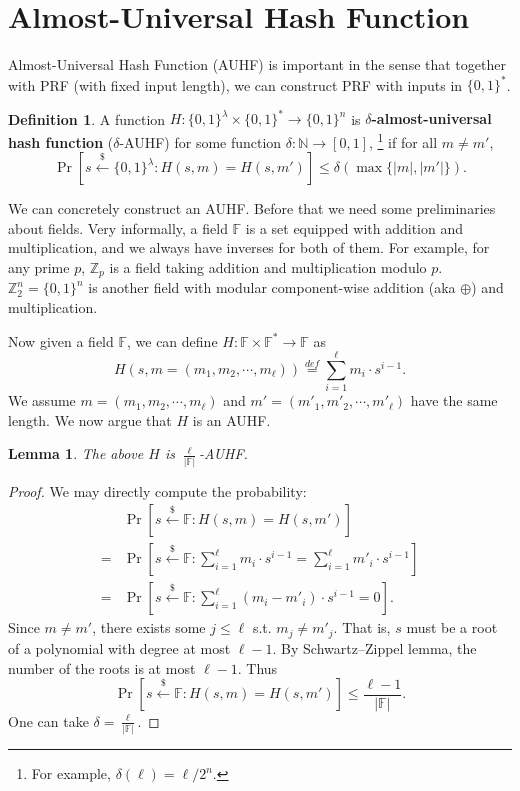 \documentclass[12pt]{article}
\newcommand{\eqdef}{\stackrel{def}{=}}
\newcommand{\N}{\mathbb{N}}
\newcommand{\Z}{\mathbb{Z}}
\newcommand{\F}{\mathbb{F}}
\newcommand{\bits}{\{0,1\}}
\newcommand{\getsr}{\stackrel{\$}{\gets}}
\newtheorem{lemma}[theorem]{Lemma}
\theoremstyle{definition}
\newtheorem{definition}[theorem]{Definition}
\begin{document}
\section{Almost-Universal Hash Function}
Almost-Universal Hash Function (AUHF) is important in the sense that together with PRF (with fixed input length), we can construct PRF with inputs in $\bits^*$.

\begin{definition}
A function $H : \bits^\lambda \times \bits^* \to \bits^n$ is {\bf $\delta$-almost-universal hash function} ($\delta$-AUHF) for some function $\delta : \N \to [0,1]$, \footnote{For example, $\delta(\ell) = \ell/2^n$.} if for all $m \not= m'$,
$$\Pr[s \getsr \bits^\lambda : H(s,m) = H(s, m')] \leq \delta(\max\{|m|, |m'|\}).$$ 
\end{definition}

We can concretely construct an AUHF. Before that we need some preliminaries about fields. Very informally, a field $\F$ is a set equipped with addition and multiplication, and we always have inverses for both of them. For example, for any prime $p$, $\Z_p$ is a field taking addition and multiplication modulo $p$. $\Z_2^n = \bits^n$ is another field with modular component-wise addition (aka $\oplus$) and multiplication. 

Now given a field $\F$, we can define $H : \F \times \F^* \to \F$ as
$$H(s, m=(m_1, m_2, \cdots, m_\ell)) \eqdef \sum_{i=1}^{\ell} m_i \cdot s^{i-1}.$$
We assume $m = (m_1, m_2, \cdots, m_\ell)$ and $m' = (m'_1, m'_2, \cdots, m'_\ell)$ have the same length. We now argue that $H$ is an AUHF.

\begin{lemma}
The above $H$ is $\frac{\ell}{|\F|}$-AUHF.
\end{lemma}
\begin{proof}
We may directly compute the probability:
$$\begin{aligned}
& \Pr[s \getsr \F : H(s,m) = H(s,m')] \\ 
=& \Pr[s \getsr \F : \sum_{i=1}^{\ell} m_i \cdot s^{i-1} = \sum_{i=1}^{\ell} m'_i \cdot s^{i-1}] \\
=& \Pr[s \getsr \F : \sum_{i=1}^{\ell} (m_i-m'_i) \cdot s^{i-1} = 0].
\end{aligned}$$
Since $m \not= m'$, there exists some $j \leq \ell$ s.t. $m_j \not= m'_j$. That is, $s$ must be a root of a polynomial with degree at most $\ell-1$. By Schwartz–Zippel lemma, the number of the roots is at most $\ell-1$. Thus
$$\Pr[s \getsr \F : H(s,m) = H(s,m')] \leq \frac{\ell-1}{|\F|}.$$
One can take $\delta = \frac{\ell}{|\F|}$.
\end{proof}
\end{document}
